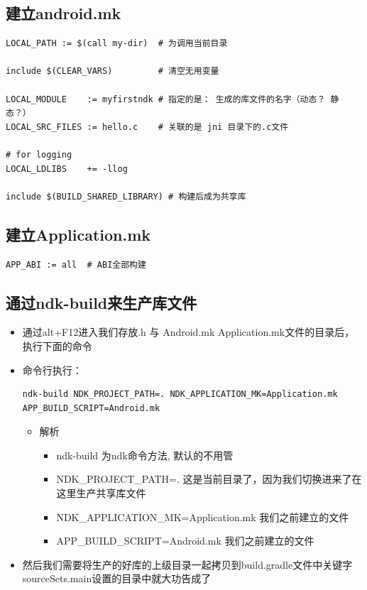 \documentclass[9pt, b5paper]{article}
\begin{document}
\subsection{建立android.mk}
\label{sec-2-7}
\begin{verbatim}
LOCAL_PATH := $(call my-dir)  # 为调用当前目录

include $(CLEAR_VARS)         # 清空无用变量

LOCAL_MODULE    := myfirstndk # 指定的是： 生成的库文件的名字（动态？ 静态？）
LOCAL_SRC_FILES := hello.c    # 关联的是 jni 目录下的.c文件

# for logging
LOCAL_LDLIBS    += -llog

include $(BUILD_SHARED_LIBRARY) # 构建后成为共享库
\end{verbatim}

\subsection{建立Application.mk}
\label{sec-2-8}
\begin{verbatim}
APP_ABI := all  # ABI全部构建
\end{verbatim}

\subsection{通过ndk-build来生产库文件}
\label{sec-2-9}
\begin{itemize}
\item 通过alt+F12进入我们存放.h 与 Android.mk Application.mk文件的目录后，执行下面的命令
\item 命令行执行： 
\begin{verbatim}
ndk-build NDK_PROJECT_PATH=. NDK_APPLICATION_MK=Application.mk APP_BUILD_SCRIPT=Android.mk
\end{verbatim}
\begin{itemize}
\item 解析
\begin{itemize}
\item ndk-build 为ndk命令方法, 默认的不用管
\item NDK\_PROJECT\_PATH=. 这是当前目录了，因为我们切换进来了在这里生产共享库文件
\item NDK\_APPLICATION\_MK=Application.mk 我们之前建立的文件
\item APP\_BUILD\_SCRIPT=Android.mk 我们之前建立的文件
\end{itemize}
\end{itemize}
\item 然后我们需要将生产的好库的上级目录一起拷贝到build.gradle文件中关键字 sourceSets.main设置的目录中就大功告成了
\end{itemize}
\end{document}
